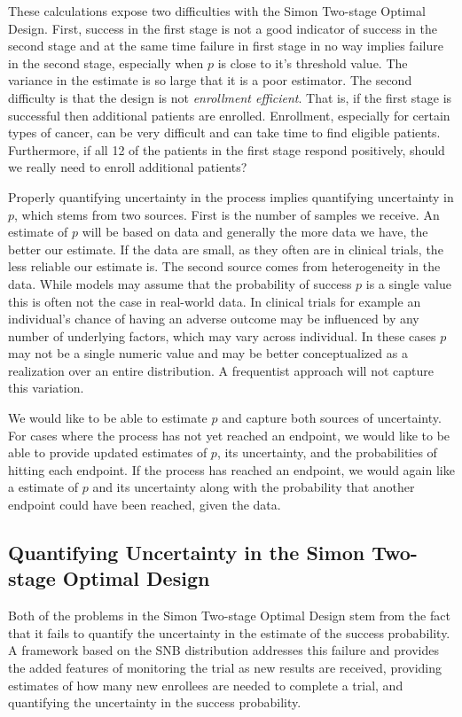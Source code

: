 \documentclass[12pt]{article}         %
\begin{document}
These calculations expose two difficulties with the Simon Two-stage Optimal 
Design. First, success in the first stage is not a good indicator of success 
in the second stage and at the same time failure in first stage in no way 
implies failure in the second stage, especially when $p$ is close to it's 
threshold value. The variance in the estimate is so large that it is a poor 
estimator. The second difficulty is that the design is not {\em enrollment 
efficient}. That is, if the first stage is successful then additional patients 
are enrolled. Enrollment, especially for certain types of cancer, can be very 
difficult and can take time to find eligible patients. Furthermore, if 
all 12 of the patients in the first stage respond positively, should we 
really need to enroll additional patients?

Properly quantifying uncertainty in the process implies quantifying 
uncertainty in $p$, which stems from two sources. First is the number of 
samples we receive. An estimate of $p$ will be based on data and generally 
the more data we have, the better our estimate. If the data are small, as 
they often are in clinical trials, the less reliable our estimate is. The 
second source comes from heterogeneity in the data. While models may assume 
that the probability of success $p$ is a single value this is often not the 
case in real-world data. In clinical trials for example an individual's chance 
of having an adverse outcome may be influenced by any number of underlying 
factors, which may vary across individual. In these cases $p$ may not be a 
single numeric value and may be better conceptualized as a realization over 
an entire distribution. A frequentist approach will not capture this variation.

We would like to be able to estimate $p$ and capture both sources of uncertainty. For cases where the process has not yet reached an endpoint, we would like to be able to provide updated estimates of $p$, its uncertainty, and the probabilities of hitting each endpoint. If the process has reached an endpoint, we would again like a estimate of $p$ and its uncertainty along with the probability that another endpoint could have been reached, given the data. 

\subsection{Quantifying Uncertainty in the Simon Two-stage Optimal Design}

Both of the problems in the Simon Two-stage Optimal Design stem from the fact that it fails to quantify the uncertainty in the estimate of the success probability. A framework based on the SNB distribution addresses this failure and 
provides the added features of monitoring the trial as new results are 
received, providing estimates of how many new enrollees are needed to complete 
a trial, and quantifying the uncertainty in the success probability.
\end{document}
